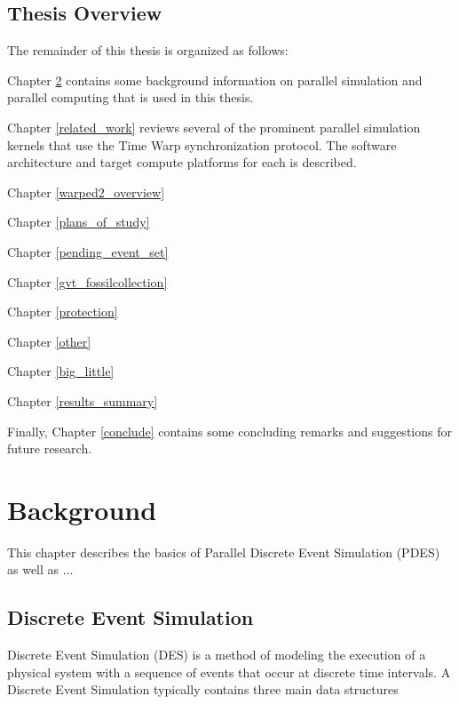 \documentclass[11pt]{book}
\begin{document}
\section{Thesis Overview}

The remainder of this thesis is organized as follows:

Chapter \ref{background} contains some background information on parallel simulation and
parallel computing that is used in this thesis.

Chapter \ref{related_work} reviews several of the prominent parallel simulation kernels
that use the Time Warp synchronization protocol.  The software architecture and target
compute platforms for each is described.

Chapter \ref{warped2_overview}

Chapter \ref{plans_of_study}

Chapter \ref{pending_event_set}

Chapter \ref{gvt_fossilcollection}

Chapter \ref{protection}

Chapter \ref{other}

Chapter \ref{big_little}

Chapter \ref{results_summary}

Finally, Chapter \ref{conclude} contains some concluding remarks and suggestions for
future research.


\chapter{Background}\label{background}

This chapter describes the basics of Parallel Discrete Event Simulation (PDES) as well as ...


\section{Discrete Event Simulation}

Discrete Event Simulation (DES) is a method of modeling the execution of a physical system with a
sequence of events that occur at discrete time intervals. A Discrete Event Simulation typically
contains three main data structures
\end{document}
